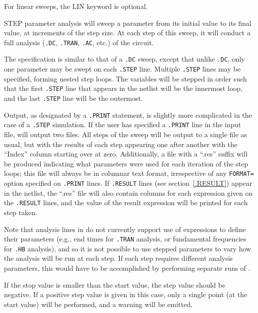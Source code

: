\begin{Command}
For linear sweeps, the LIN keyword is optional.

STEP parameter analysis will sweep a parameter from its initial value to
its final value, at increments of the step size.  At each step of this
sweep, it will conduct a full analysis (\texttt{.DC}, \texttt{.TRAN},
\texttt{.AC}, etc.) of the circuit.

The specification is similar to that of a \texttt{.DC} sweep, except
that unlike \texttt{.DC}, only one parameter may be swept on
each \texttt{.STEP} line.  Multiple \texttt{.STEP} lines may be
specified, forming nested step loops.  The variables will be stepped
in order such that the first \texttt{.STEP} line that appears in the
netlist will be the innermost loop, and the last \texttt{.STEP} line
will be the outermost.

Output, as designated by a \texttt{.PRINT} statement, is slightly more
complicated in the case of a \texttt{.STEP} simulation.  If the user
has specified a \texttt{.PRINT} line in the input file, \Xyce{} will
output two files.  All steps of the sweep will be output to a single file as
usual, but with the results of each step appearing one after another
with the ``Index'' column starting over at zero.  Additionally, a file
with a ``.res'' suffix will be produced indicating what parameters
were used for each iteration of the step loops; this file will always
be in columnar text format, irrespective of any \texttt{FORMAT=}
option specified on \texttt{.PRINT} lines.  If \texttt{.RESULT} lines
(see section~\ref{.RESULT}) appear in the netlist, the ``.res'' file
will also contain columns for each expression given
on the \texttt{.RESULT} lines, and the value of the result expression
will be printed for each step taken.

Note that analysis lines in \Xyce{} do not currently support use of
expressions to define their parameters (e.g., end times
for \texttt{.TRAN} analysis, or fundamental frequencies
for \texttt{.HB} analysis), and so it is not possible to use stepped
parameters to vary how the analysis will be run at each step.  If each
step requires different analysis parameters, this would have to be
accomplished by performing separate runs of \Xyce{}.

If the stop value is smaller than the start value, the step value
should be negative.  If a positive step value is given in this case,
only a single point (at the start value) will be performed, and a
warning will be emitted.

\end{Command}

